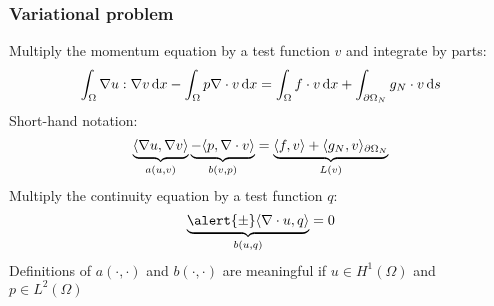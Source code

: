 \begin{frame}
  \frametitle{Variational problem}
  Multiply the momentum equation by a test function $v$ and integrate
  by parts:
  \begin{align*}
    \int_{\Omega} \nabla u : \nabla v \, \mathrm{d}x
      - \int_{\Omega} p \nabla \cdot
    v \, \mathrm{d}x
      = \int_{\Omega} f \cdot v \, \mathrm{d}x + \int_{\partial \Omega_N} g_N \cdot
    v \, \mathrm{d}s
  \end{align*}
  Short-hand notation:
  \begin{equation*}
    \underbrace{
      \langle \nabla u, \nabla v \rangle
    }_{a(u,v)}
    \underbrace{
  - \langle p, \nabla \cdot v \rangle
  }_{b(v,p)}
    = \underbrace{
   \langle f, v \rangle + \langle g_N, v \rangle_{\partial \Omega_N}
  }_{L(v)}
  \end{equation*}
  Multiply the continuity equation by a test function $q$:
  \begin{equation*}
    \underbrace{\alert{\pm}\inner{\nabla \cdot u}{q}}_{b(u,q)} = 0
  \end{equation*}
  Definitions of $a(\cdot,\cdot)$ and $b(\cdot,\cdot)$ are meaningful if
  $u \in H^1(\Omega)$ and $p \in L^2(\Omega)$

\end{frame}

